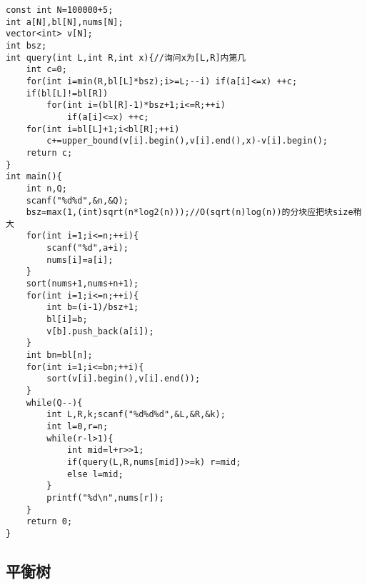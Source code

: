 \documentclass[UTF8]{ctexart}
\begin{document}
\begin{lstlisting}
const int N=100000+5;
int a[N],bl[N],nums[N];
vector<int> v[N];
int bsz;
int query(int L,int R,int x){//询问x为[L,R]内第几
    int c=0;
    for(int i=min(R,bl[L]*bsz);i>=L;--i) if(a[i]<=x) ++c;
    if(bl[L]!=bl[R])
        for(int i=(bl[R]-1)*bsz+1;i<=R;++i)
            if(a[i]<=x) ++c;
    for(int i=bl[L]+1;i<bl[R];++i)
        c+=upper_bound(v[i].begin(),v[i].end(),x)-v[i].begin();
    return c;
}
int main(){
    int n,Q;
    scanf("%d%d",&n,&Q);
    bsz=max(1,(int)sqrt(n*log2(n)));//O(sqrt(n)log(n))的分块应把块size稍大 
    for(int i=1;i<=n;++i){
        scanf("%d",a+i);
        nums[i]=a[i];
    }
    sort(nums+1,nums+n+1);
    for(int i=1;i<=n;++i){
        int b=(i-1)/bsz+1;
        bl[i]=b;
        v[b].push_back(a[i]);
    }
    int bn=bl[n];
    for(int i=1;i<=bn;++i){
        sort(v[i].begin(),v[i].end());
    } 
    while(Q--){
        int L,R,k;scanf("%d%d%d",&L,&R,&k);
        int l=0,r=n;
        while(r-l>1){
            int mid=l+r>>1;
            if(query(L,R,nums[mid])>=k) r=mid;
            else l=mid;
        }
        printf("%d\n",nums[r]);
    }
    return 0;
}
\end{lstlisting}
\subsection{平衡树}
\end{document}

